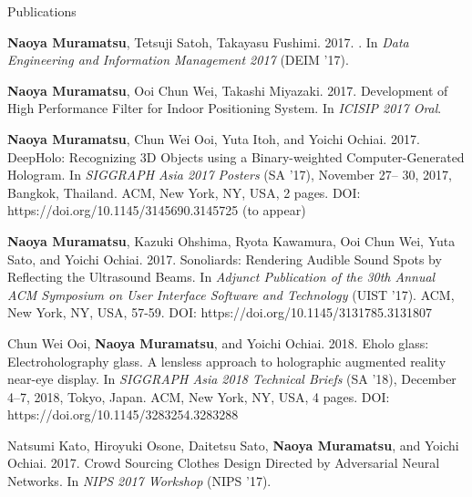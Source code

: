 \documentclass{resume} %
\begin{document}

\begin{rSection}{Publications} \itemsep 4pt

\item \textbf{Naoya Muramatsu}, Tetsuji Satoh, Takayasu Fushimi. 2017. . In \textit{Data Engineering and Information Management 2017} (DEIM '17). %
\item \textbf{Naoya Muramatsu}, Ooi Chun Wei, Takashi Miyazaki. 2017. Development of High Performance Filter for Indoor Positioning System. In \textit{ICISIP 2017 Oral}.
\item \textbf{Naoya Muramatsu}, Chun Wei Ooi, Yuta Itoh, and Yoichi Ochiai. 2017. DeepHolo: Recognizing 3D Objects using a Binary-weighted Computer-Generated Hologram. In \textit{SIGGRAPH Asia 2017 Posters} (SA '17), November 27– 30, 2017, Bangkok, Thailand. ACM, New York, NY, USA, 2 pages. DOI: https://doi.org/10.1145/3145690.3145725 (to appear)
\item \textbf{Naoya Muramatsu}, Kazuki Ohshima, Ryota Kawamura, Ooi Chun Wei, Yuta Sato, and Yoichi Ochiai. 2017. Sonoliards: Rendering Audible Sound Spots by Reflecting the Ultrasound Beams. In \textit{Adjunct Publication of the 30th Annual ACM Symposium on User Interface Software and Technology} (UIST ’17). ACM, New York, NY, USA, 57-59. DOI: https://doi.org/10.1145/3131785.3131807
\item Chun Wei Ooi, \textbf{Naoya Muramatsu}, and Yoichi Ochiai. 2018. Eholo glass: Electroholography glass. A lensless approach to holographic augmented reality near-eye display. In \textit{SIGGRAPH Asia 2018 Technical Briefs} (SA ’18), December 4–7, 2018, Tokyo, Japan. ACM, New York, NY, USA, 4 pages. DOI: https://doi.org/10.1145/3283254.3283288
\item Natsumi Kato, Hiroyuki Osone, Daitetsu Sato, \textbf{Naoya Muramatsu}, and Yoichi Ochiai. 2017. Crowd Sourcing Clothes Design Directed by Adversarial Neural Networks. In \textit{NIPS 2017 Workshop} (NIPS ’17).

\end{rSection}
\end{document}
